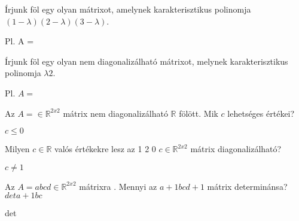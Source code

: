 \begin{frame}
  \begin{tcolorbox}[title={8/2. -N-}]
     Írjunk föl egy olyan mátrixot, amelynek karakterisztikus polinomja $(1-{\lambda})(2-{\lambda})(3-{\lambda})$.

  \tcblower

    \mmedskip 
    
     Pl. A =
  \end{tcolorbox}
\end{frame}


\begin{frame}
  \begin{tcolorbox}[title={8/3. -R-}]
    Írjunk föl egy olyan nem diagonalizálható mátrixot, melynek karakterisztikus polinomja ${\lambda}2$.

  \tcblower

    \mmedskip 
    
    Pl. $A =$
  \end{tcolorbox}
\end{frame}


\begin{frame}
  \begin{tcolorbox}[title={8/4. -Q-}]
    Az $A =  \in \mathbb{R}^{2 x 2}$ mátrix nem diagonalizálható $\mathbb{R}$ fölött. Mik $c$ lehetséges értékei?


  \tcblower

    \mmedskip 
    
    $c \leq 0$
  \end{tcolorbox}
\end{frame}


\begin{frame}
  \begin{tcolorbox}[title={8/5. -Q-}]
    Milyen $c \in \mathbb{R}$ valós értékekre lesz az 1 2 0 $c \in \mathbb{R}^{2 x 2}$ mátrix diagonalizálható?

  \tcblower

    \mmedskip 
    
     $c \neq 1$
  \end{tcolorbox}
\end{frame}


\begin{frame}
  \begin{tcolorbox}[title={8/6. -Q-}]
     Az $A =a b c d \in \mathbb{R}^{2 x 2}$ mátrixra . Mennyi az $a + 1 b c d + 1$ mátrix determinánsa? $det a + 1 b c$ 

  \tcblower

    \mmedskip 
    
     det
  \end{tcolorbox}
\end{frame}



